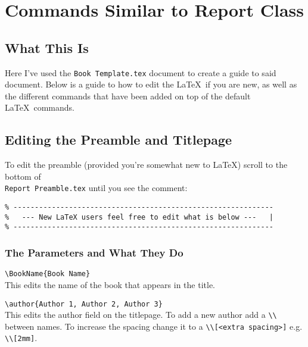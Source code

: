 \documentclass[Book Template.tex]{subfiles}
\begin{document}
    \chapter{Commands Similar to Report Class}
        \label{ch: Commands Shared with Report}
        \thispagestyle{noheader}

        \section{What This Is}
            \label{sec: what this is}
            
            Here I've used the \verb+Book Template.tex+ document to create a guide to said document. Below is a guide to how to edit the \LaTeX~if you are new, as well as the different commands that have been added on top of the default \LaTeX~commands.
        

        \section{Editing the Preamble and Titlepage}
            \label{sec: editing the preamble}

            To edit the preamble (provided you're somewhat new to \LaTeX) scroll to the bottom of \\\verb+Report Preamble.tex+ until you see the comment:

            \begin{lstlisting}
% -------------------------------------------------------------
%   --- New LaTeX users feel free to edit what is below ---   |
% -------------------------------------------------------------
            \end{lstlisting}



            \subsection{The Parameters and What They Do}
                \label{subsec: the parameters and what they do}

                \verb+\BookName{Book Name}+\\
                This edits the name of the book that appears in the title.

                \verb+\author{Author 1, Author 2, Author 3}+\\
                This edits the author field on the titlepage. To add a new author add a \verb+\\+ between names. To increase the spacing change it to a \verb+\\[<extra spacing>]+ e.g. \verb+\\[2mm]+.
\end{document}
